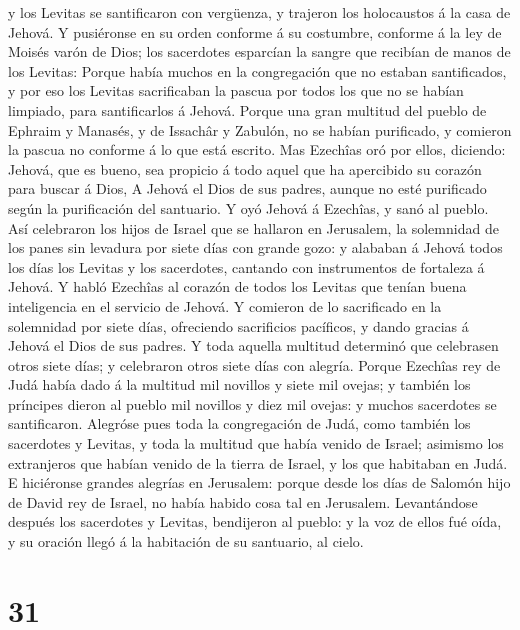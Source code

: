 y los Levitas se santificaron con vergüenza, y trajeron los holocaustos
á la casa de Jehová.  Y pusiéronse en su orden conforme á
su costumbre, conforme á la ley de Moisés varón de Dios; los sacerdotes
esparcían la sangre que recibían de manos de los Levitas:
 Porque había muchos en la congregación que no estaban
santificados, y por eso los Levitas sacrificaban la pascua por todos los
que no se habían limpiado, para santificarlos á Jehová. 
Porque una gran multitud del pueblo de Ephraim y Manasés, y de Issachâr
y Zabulón, no se habían purificado, y comieron la pascua no conforme á
lo que está escrito. Mas Ezechîas oró por ellos, diciendo: Jehová, que
es bueno, sea propicio á todo aquel que ha apercibido su corazón para
buscar á Dios,  A Jehová el Dios de sus padres, aunque no
esté purificado según la purificación del santuario.  Y
oyó Jehová á Ezechîas, y sanó al pueblo.  Así celebraron
los hijos de Israel que se hallaron en Jerusalem, la solemnidad de los
panes sin levadura por siete días con grande gozo: y alababan á Jehová
todos los días los Levitas y los sacerdotes, cantando con instrumentos
de fortaleza á Jehová.  Y habló Ezechîas al corazón de
todos los Levitas que tenían buena inteligencia en el servicio de
Jehová. Y comieron de lo sacrificado en la solemnidad por siete días,
ofreciendo sacrificios pacíficos, y dando gracias á Jehová el Dios de
sus padres.  Y toda aquella multitud determinó que
celebrasen otros siete días; y celebraron otros siete días con alegría.
 Porque Ezechîas rey de Judá había dado á la multitud mil
novillos y siete mil ovejas; y también los príncipes dieron al pueblo
mil novillos y diez mil ovejas: y muchos sacerdotes se santificaron.
 Alegróse pues toda la congregación de Judá, como también
los sacerdotes y Levitas, y toda la multitud que había venido de Israel;
asimismo los extranjeros que habían venido de la tierra de Israel, y los
que habitaban en Judá.  E hiciéronse grandes alegrías en
Jerusalem: porque desde los días de Salomón hijo de David rey de Israel,
no había habido cosa tal en Jerusalem.  Levantándose
después los sacerdotes y Levitas, bendijeron al pueblo: y la voz de
ellos fué oída, y su oración llegó á la habitación de su santuario, al
cielo.

\hypertarget{section-30}{%
\section{31}\label{section-30}}

